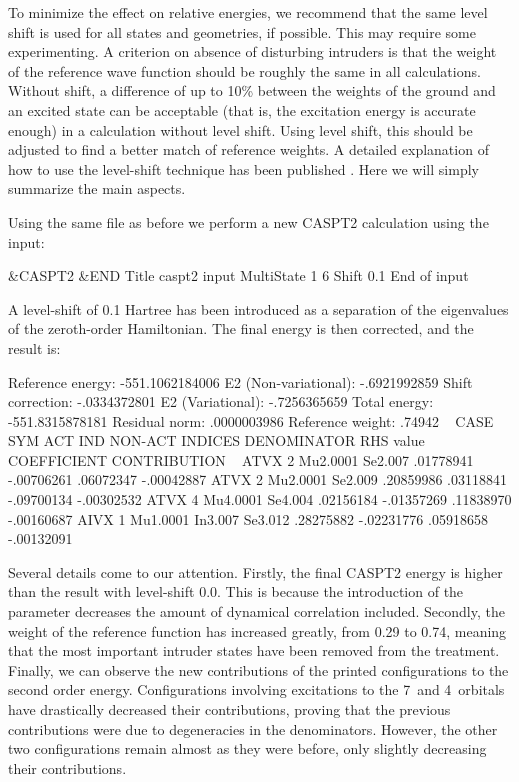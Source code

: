 To minimize the effect on relative energies, we recommend that the same level shift is
used for all states and geometries, if possible. This may require some
experimenting. A criterion on absence of disturbing intruders is that
the weight of the reference wave function should be roughly the same in
all calculations. Without shift, a difference of up to 10\% between the weights
of the ground and an excited state can be acceptable (that is, the excitation energy
is accurate enough) in a  calculation without level shift.
Using level shift,  this should be adjusted to find a better match of reference weights.
A detailed explanation of how to use the level-shift technique has been
published \cite{Roos:96a}. Here we will simply summarize the main aspects.

Using the same  file as before we perform a new CASPT2 calculation
using the input:

\begin{inputlisting}
 &CASPT2 &END
Title
 caspt2 input
MultiState
1 6
Shift
0.1
End of input
\end{inputlisting}

A level-shift of 0.1 Hartree has been introduced as a separation of the
eigenvalues of the zeroth-order Hamiltonian. The final energy is then
corrected, and the result is:

\begin{sourcelisting}
      Reference energy:        -551.1062184006
      E2 (Non-variational):       -.6921992859
      Shift correction:           -.0334372801
      E2 (Variational):           -.7256365659
      Total energy:            -551.8315878181
      Residual norm:               .0000003986
      Reference weight:            .74942
~
CASE  SYM   ACT IND   NON-ACT INDICES  DENOMINATOR  RHS value  COEFFICIENT CONTRIBUTION
~
ATVX   2   Mu2.0001   Se2.007           .01778941  -.00706261   .06072347  -.00042887
ATVX   2   Mu2.0001   Se2.009           .20859986   .03118841  -.09700134  -.00302532
ATVX   4   Mu4.0001   Se4.004           .02156184  -.01357269   .11838970  -.00160687
AIVX   1   Mu1.0001   In3.007 Se3.012   .28275882  -.02231776   .05918658  -.00132091
\end{sourcelisting}

Several details come to our attention. Firstly, the final CASPT2 energy is
higher than the result with level-shift 0.0. This is because the introduction
of the parameter decreases the amount of dynamical correlation included.
Secondly, the weight of the reference function has increased greatly, from
0.29 to 0.74, meaning that the most important intruder states have been
removed from the treatment. Finally, we can observe the new contributions
of the printed configurations to the second order energy. Configurations
involving excitations to the 7\bo\ and 4\at\ orbitals have drastically decreased
their contributions, proving that the previous contributions
were due to degeneracies in the denominators. However, the other two
configurations remain almost as they were before, only slightly
decreasing their contributions.

